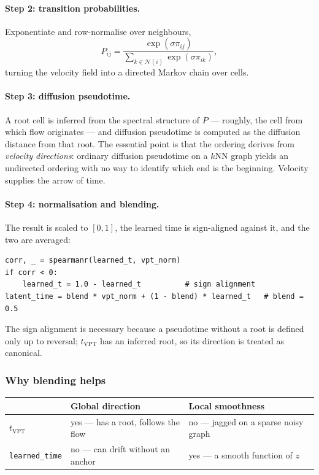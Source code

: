 \documentclass[11pt,a4paper]{article}
\theoremstyle{definition}
\begin{document}
\paragraph{Step 2: transition probabilities.} Exponentiate and row-normalise
over neighbours,
%
\begin{equation}
P_{ij} = \frac{\exp(\sigma \pi_{ij})}{\sum_{k \in \mathcal{N}(i)} \exp(\sigma \pi_{ik})},
\end{equation}
%
turning the velocity field into a directed Markov chain over cells.

\paragraph{Step 3: diffusion pseudotime.} A root cell is inferred from the
spectral structure of $P$ --- roughly, the cell from which flow originates ---
and diffusion pseudotime is computed as the diffusion distance from that root.
The essential point is that the ordering derives from \emph{velocity
directions}: ordinary diffusion pseudotime on a $k$NN graph yields an
undirected ordering with no way to identify which end is the beginning.
Velocity supplies the arrow of time.

\paragraph{Step 4: normalisation and blending.} The result is scaled to
$[0,1]$, the learned time is sign-aligned against it, and the two are averaged:

\begin{lstlisting}
corr, _ = spearmanr(learned_t, vpt_norm)
if corr < 0:
    learned_t = 1.0 - learned_t          # sign alignment
latent_time = blend * vpt_norm + (1 - blend) * learned_t   # blend = 0.5
\end{lstlisting}

The sign alignment is necessary because a pseudotime without a root is defined
only up to reversal; $t_{\text{VPT}}$ has an inferred root, so its direction is
treated as canonical.

\subsubsection{Why blending helps}

\begin{center}
\begin{tabular}{@{}lll@{}}
\toprule
 & \textbf{Global direction} & \textbf{Local smoothness} \\
\midrule
$t_{\text{VPT}}$      & yes --- has a root, follows the flow & no --- jagged on a sparse noisy graph \\
\texttt{learned\_time} & no --- can drift without an anchor  & yes --- a smooth function of $z$ \\
\bottomrule
\end{tabular}
\end{center}
\end{document}

